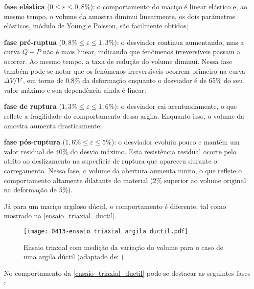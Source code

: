 \begin{alineas}
	
	\item \textbf{fase elástica} ($0\le \varepsilon \le 0,8\%$): o comportamento do maciço é linear elástico e, ao mesmo tempo, o volume da amostra diminui linearmente, os dois parâmetros elásticos, módulo de Young e Poisson, são facilmente obtidos;
	
	\item \textbf{fase pré-ruptua} ($0,8\%\le \varepsilon \le 1,3\%$): o desviador continua aumentando, mas a curva $Q-P$ não é mais linear, indicando que fenômenos irreversíveis passam a ocorrer. Ao mesmo tempo, a taxa de redução do volume diminui. Nessa fase também pode-se notar que os fenômenos irreversíveis ocorrem primeiro na curva ${\Delta V}/{V}\;$, em torno de 0,8\% da deformação enquanto o desviador é de 65\% do seu valor máximo e sua dependência ainda é linear;
	
	\item \textbf{fase de ruptura} ($1,3\%\le \varepsilon \le 1,6\%$): o desviador cai acentuadamente, o que reflete a fragilidade do comportamento dessa argila. Enquanto isso, o volume da amostra aumenta drasticamente;
	
	\item \textbf{fase pós-ruptura} ($1,6\%\le \varepsilon \le 5\%$): o desviador evoluiu pouco e mantém um valor residual de 40\% do desvio máximo. Esta resistência residual ocorre pelo atrito ao deslizamento na superfície de ruptura que apareceu durante o carregamento. Nessa fase, o volume da abertura aumenta muito, o que reflete o comportamento altamente dilatante do material (2\% superior ao volume original na deformação de 5\%).
	
\end{alineas}

Já para um maciço argiloso dúctil, o comportamento é diferente, tal como mostrado na \autoref{ensaio_triaxial_ductil}.

\begin{figure}[H]
	\begin{center}
		\texttt{[image: 0413-ensaio triaxial argila ductil.pdf]}
	\end{center}
	\caption{\label{ensaio_triaxial_ductil}Ensaio triaxial com medição da variação do volume para o caso de uma argila dúctil (adaptado de: )}
\end{figure}

No comportamento da \autoref{ensaio_triaxial_ductil} pode-se destacar as seguintes fases \cite[p. 35]{Rousset1988}:

